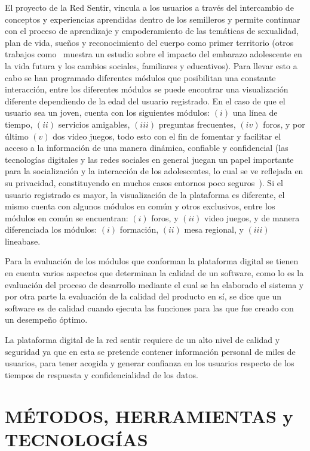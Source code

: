 \documentclass[journal,transmag]{IEEEtran}
\begin{document}
El proyecto de la Red Sentir, vincula a los usuarios a través del intercambio de conceptos y experiencias aprendidas dentro de los semilleros y permite continuar con el proceso de aprendizaje y empoderamiento de las temáticas de sexualidad, plan de vida, sueños y reconocimiento del cuerpo como primer territorio (otros trabajos como~\cite{zeck2007impact} muestra un estudio sobre el impacto del embarazo adolescente en la vida futura y los cambios sociales, familiares y educativos). Para llevar esto a cabo se han programado diferentes módulos que posibilitan una constante interacción, entre los diferentes módulos se puede encontrar una visualización diferente dependiendo de la edad del usuario registrado. 
En el caso de que el usuario sea un joven, cuenta con los siguientes módulos: $(i)$ una línea de tiempo, $(ii)$ servicios amigables, $(iii)$ preguntas frecuentes, $(iv)$ foros, y por último $(v)$ dos video juegos, todo esto con el fin de fomentar y facilitar el acceso a la información de una manera dinámica, confiable y confidencial (las tecnologías digitales y las redes sociales en general juegan un papel importante para la socialización y la interacción de los adolescentes, lo cual se ve reflejada en su privacidad, constituyendo en muchos casos entornos poco seguros~\cite{hasinoff2013sexting, boyd2007youth}). Si el usuario registrado es mayor, la visualización de la plataforma es diferente, el mismo cuenta con algunos módulos en común y otros exclusivos, entre los módulos en común se encuentran: $(i)$ foros, y $(ii)$ video juegos, y de manera diferenciada los módulos:  $(i)$ formación, $(ii)$ mesa regional, y $(iii)$ lineabase.

Para la evaluación de los módulos que conforman la plataforma digital se tienen en cuenta varios aspectos que determinan la calidad de un software, como lo es la evaluación del proceso de desarrollo mediante el cual se ha elaborado el sistema y por otra parte la evaluación de la calidad del producto en sí, se dice que un software es de calidad cuando ejecuta las funciones para las que fue creado con un desempeño óptimo.

La plataforma digital de la red sentir requiere de un alto nivel de calidad y seguridad ya que en esta se pretende contener información personal de miles de usuarios, para tener acogida y generar confianza en los usuarios respecto de los tiempos de respuesta y confidencialidad de los datos.

\section{MÉTODOS, HERRAMIENTAS y TECNOLOGÍAS}\label{sec:herramientas}
\end{document}
